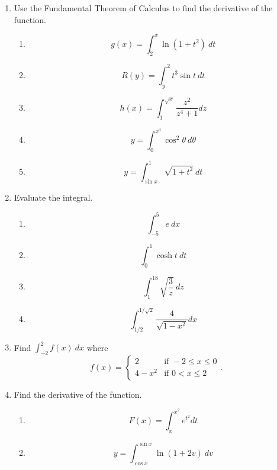 \documentclass[12pt]{article}
\begin{document}
\begin{multicols*}{2}
\begin{enumerate}
		\item Use the Fundamental Theorem of Calculus to find the derivative of the function.
		\begin{enumerate}
			\item \[
			g(x) = \int_2^x\ln(1+t^2)\ dt
			\]

			\item \[
			R(y) = \int_y^2 t^3\sin t\ dt
			\]

			\item \[
			h(x) = \int_1^{\sqrt{x}}\frac{z^2}{z^4+1}dz
			\]

			\item \[
			y = \int_0^{x^4}\cos^2\theta\ d\theta
			\]

			\item \[
			y = \int_{\sin x}^1 \sqrt{1+t^2}\ dt
			\]
		\end{enumerate}


		\item Evaluate the integral.
		\begin{enumerate}
			\item \[
			\int_{-5}^5 e\ dx
			\]

			\item \[
			\int_0^1\cosh t\ dt
			\]

			\item \[
			\int_1^{18}\sqrt{\frac{3}{z}}\ dz
			\]

			\item \[
			\int_{1/2}^{1/\sqrt{2}}\frac{4}{\sqrt{1-x^2}}dx
			\]
		\end{enumerate}

		\item Find $\int_{-2}^2 f(x)\ dx$ where 
		\[
		f(x) = \begin{cases}
			2& \text{if }-2\leq x\leq 0\\
			4-x^2 & \text{if }0<x\leq 2
		\end{cases}.
		\]

		\columnbreak

		\item Find the derivative of the function.
		\begin{enumerate}
			\item \[
			F(x) = \int_x^{x^2}e^{t^2}dt
			\]

			\item \[
			y = \int_{\cos x}^{\sin x}\ln(1+2v)\ dv
			\]
		\end{enumerate}

		\vfill


\end{enumerate}
\end{multicols*}
\end{document}
